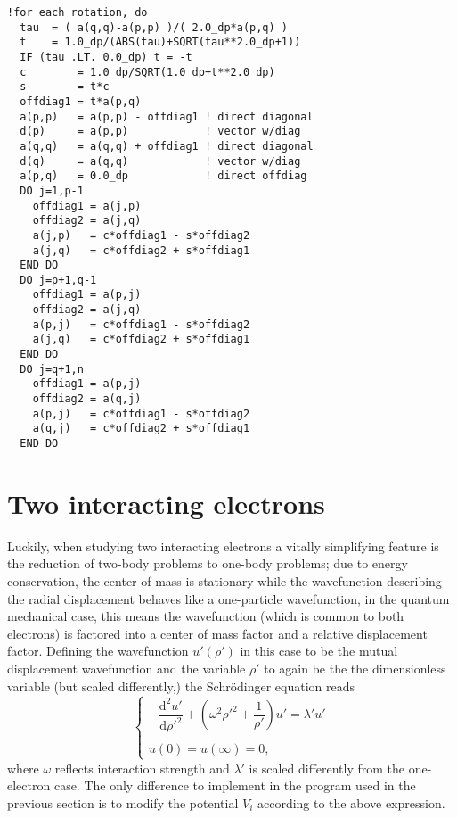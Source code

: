 \documentclass[a4paper,twocolumn,nofootinbib]{revtex4-1}
\newcommand{\dd}[1]{\mathrm{d}#1}
\begin{document}
\newpage

\begin{lstlisting}[title={Jacobi rotation algorithm}]
!for each rotation, do
  tau  = ( a(q,q)-a(p,p) )/( 2.0_dp*a(p,q) )
  t    = 1.0_dp/(ABS(tau)+SQRT(tau**2.0_dp+1))
  IF (tau .LT. 0.0_dp) t = -t
  c        = 1.0_dp/SQRT(1.0_dp+t**2.0_dp)
  s        = t*c
  offdiag1 = t*a(p,q)
  a(p,p)   = a(p,p) - offdiag1 ! direct diagonal
  d(p)     = a(p,p)	           ! vector w/diag
  a(q,q)   = a(q,q) + offdiag1 ! direct diagonal
  d(q)     = a(q,q)	           ! vector w/diag
  a(p,q)   = 0.0_dp	           ! direct offdiag
  DO j=1,p-1
    offdiag1 = a(j,p)
    offdiag2 = a(j,q)
    a(j,p)   = c*offdiag1 - s*offdiag2
    a(j,q)   = c*offdiag2 + s*offdiag1
  END DO
  DO j=p+1,q-1
    offdiag1 = a(p,j)
    offdiag2 = a(j,q)
    a(p,j)   = c*offdiag1 - s*offdiag2
    a(j,q)   = c*offdiag2 + s*offdiag1
  END DO
  DO j=q+1,n
    offdiag1 = a(p,j)
    offdiag2 = a(q,j)
    a(p,j)   = c*offdiag1 - s*offdiag2
    a(q,j)   = c*offdiag2 + s*offdiag1
  END DO
\end{lstlisting}
\section*{Two interacting electrons}
Luckily, when studying two interacting electrons a vitally simplifying feature is the reduction of two-body problems to one-body problems;
due to energy conservation, the center of mass is stationary while the wavefunction describing the radial displacement behaves like a one-particle wavefunction, in
the quantum mechanical case, this means the wavefunction (which is common to both electrons) is factored into a center of mass factor and a relative displacement factor.
Defining the 
wavefunction $u'(\rho')$ in this case to be the mutual displacement wavefunction and the variable
$\rho'$ to again be the the dimensionless variable (but scaled differently,) the Schr\"odinger equation reads
\[
 \begin{cases}
  -\dfrac{\dd{^2u'}}{\dd{\rho'^2}}+\left( \omega^2 \rho'^2+\dfrac{1}{\rho'} \right) u' = \lambda'u'\\
  \\
  u(0)=u(\infty)=0,
 \end{cases}
\]
where $\omega$ reflects interaction strength and $\lambda'$ is scaled differently from the one-electron case. The only difference to implement in the program used in the previous section is to modify the potential $V_i$ according to the above expression.
\end{document}
